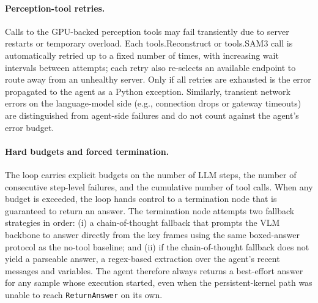 \documentclass{llmxive}
\providecommand{\apicode}[1]{#1}
\begin{document}
\paragraph{Perception-tool retries.}
Calls to the GPU-backed perception tools may fail transiently due to server restarts or temporary overload. Each \apicode{tools.Reconstruct} or \apicode{tools.SAM3} call is automatically retried up to a fixed number of times, with increasing wait intervals between attempts; each retry also re-selects an available endpoint to route away from an unhealthy server. Only if all retries are exhausted is the error propagated to the agent as a Python exception. Similarly, transient network errors on the language-model side (e.g., connection drops or gateway timeouts) are distinguished from agent-side failures and do not count against the agent's error budget.

\paragraph{Hard budgets and forced termination.}
The loop carries explicit budgets on the number of LLM steps, the number of consecutive step-level failures, and the cumulative number of tool calls. When any budget is exceeded, the loop hands control to a termination node that is guaranteed to return an answer. The termination node attempts two fallback strategies in order: (i) a chain-of-thought fallback that prompts the VLM backbone to answer directly from the key frames using the same boxed-answer protocol as the no-tool baseline; and (ii) if the chain-of-thought fallback does not yield a parseable answer, a regex-based extraction over the agent's recent messages and variables. The agent therefore always returns a best-effort answer for any sample whose execution started, even when the persistent-kernel path was unable to reach \texttt{ReturnAnswer} on its own.
\end{document}
